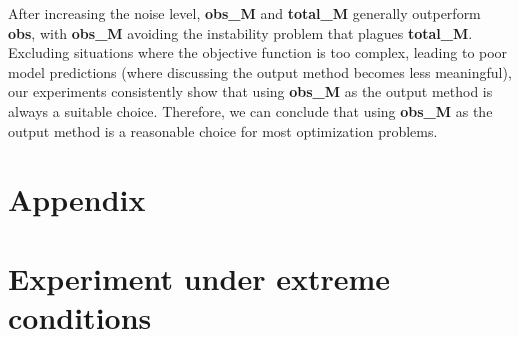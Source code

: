 \documentclass{article}
\begin{document}
\hspace{2em}After increasing the noise level, \textbf{obs\_M} and \textbf{total\_M} generally outperform \textbf{obs}, with \textbf{obs\_M} avoiding the instability problem that plagues \textbf{total\_M}. Excluding situations where the objective function is too complex, leading to poor model predictions (where discussing the output method becomes less meaningful), our experiments consistently show that using \textbf{obs\_M} as the output method is always a suitable choice. Therefore, we can conclude that using \textbf{obs\_M} as the output method is a reasonable choice for most optimization problems.









\clearpage

{\centering\section*{Appendix}}
\appendix
\section{Experiment under extreme conditions}
\end{document}
